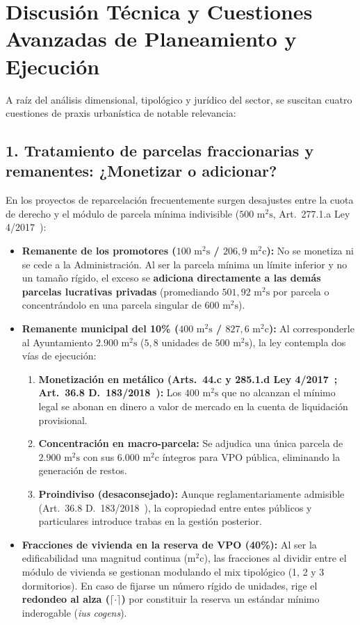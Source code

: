 \documentclass[11pt,a4paper]{article}
\begin{document}
\section{Discusión Técnica y Cuestiones Avanzadas de Planeamiento y Ejecución}

A raíz del análisis dimensional, tipológico y jurídico del sector, se suscitan cuatro cuestiones de praxis urbanística de notable relevancia:

\subsection{1. Tratamiento de parcelas fraccionarias y remanentes: ¿Monetizar o adicionar?}
En los proyectos de reparcelación frecuentemente surgen desajustes entre la cuota de derecho y el módulo de parcela mínima indivisible ($500\text{ m}^2\text{s}$, Art.~277.1.a Ley 4/2017~\cite{ley4_2017_canarias}):
\begin{itemize}
  \item \textbf{Remanente de los promotores ($100\text{ m}^2\text{s}$ / $206,9\text{ m}^2\text{c}$):} No se monetiza ni se cede a la Administración. Al ser la parcela mínima un límite inferior y no un tamaño rígido, el exceso se \textbf{adiciona directamente a las demás parcelas lucrativas privadas} (promediando $501,92\text{ m}^2\text{s}$ por parcela o concentrándolo en una parcela singular de $600\text{ m}^2\text{s}$).
  \item \textbf{Remanente municipal del 10\% ($400\text{ m}^2\text{s}$ / $827,6\text{ m}^2\text{c}$):} Al corresponderle al Ayuntamiento $2.900\text{ m}^2\text{s}$ ($5,8$ unidades de $500\text{ m}^2\text{s}$), la ley contempla dos vías de ejecución:
  \begin{enumerate}[label=\alph*)]
    \item \textbf{Monetización en metálico (Arts.~44.c y 285.1.d Ley 4/2017~\cite{ley4_2017_canarias}; Art.~36.8 D.~183/2018~\cite{decreto183_2018_canarias}):} Los $400\text{ m}^2\text{s}$ que no alcanzan el mínimo legal se abonan en dinero a valor de mercado en la cuenta de liquidación provisional.
    \item \textbf{Concentración en macro-parcela:} Se adjudica una única parcela de $2.900\text{ m}^2\text{s}$ con sus $6.000\text{ m}^2\text{c}$ íntegros para VPO pública, eliminando la generación de restos.
    \item \textbf{Proindiviso (desaconsejado):} Aunque reglamentariamente admisible (Art.~36.8 D.~183/2018~\cite{decreto183_2018_canarias}), la copropiedad entre entes públicos y particulares introduce trabas en la gestión posterior.
  \end{enumerate}
  \item \textbf{Fracciones de vivienda en la reserva de VPO (40\%):} Al ser la edificabilidad una magnitud continua ($\text{m}^2\text{c}$), las fracciones al dividir entre el módulo de vivienda se gestionan modulando el mix tipológico (1, 2 y 3 dormitorios). En caso de fijarse un número rígido de unidades, rige el \textbf{redondeo al alza ($\lceil \cdot \rceil$)} por constituir la reserva un estándar mínimo inderogable (\textit{ius cogens}).
\end{itemize}
\end{document}
